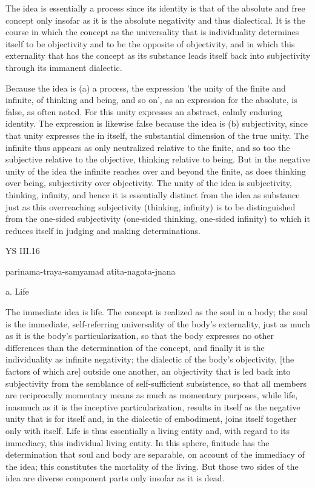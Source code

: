 The idea is essentially a process since its identity is
that of the absolute and free concept only insofar as
it is the absolute negativity and thus dialectical.
It is the course in which the concept
as the universality that is individuality
determines itself to be objectivity
and to be the opposite of objectivity,
and in which this externality
that has the concept as its substance leads
itself back into subjectivity
through its immanent dialectic.

Because the idea is (a) a process, the expression
'the unity of the finite and infinite,
of thinking and being, and so on',
as an expression for the absolute,
is false, as often noted.
For this unity expresses
an abstract, calmly enduring identity.
The expression is likewise false
because the idea is (b) subjectivity,
since that unity expresses the in itself,
the substantial dimension of the true unity.
The infinite thus appears as only
neutralized relative to the finite,
and so too the subjective relative to the objective,
thinking relative to being.
But in the negative unity of the idea
the infinite reaches over and beyond the finite,
as does thinking over being,
subjectivity over objectivity.
The unity of the idea is
subjectivity, thinking, infinity,
and hence it is essentially distinct
from the idea as substance
just as this overreaching subjectivity (thinking, infinity)
is to be distinguished from the one-sided subjectivity
(one-sided thinking, one-sided infinity)
to which it reduces itself in
judging and making determinations.

YS III.16

parinama-traya-samyamad atita-nagata-jnana

a. Life

The immediate idea is life.
The concept is realized as the soul in a body;
the soul is the immediate, self-referring
universality of the body's externality,
just as much as it is the body's particularization,
so that the body expresses no other differences
than the determination of the concept,
and finally it is the individuality as infinite negativity;
the dialectic of the body's objectivity,
[the factors of which are] outside one another,
an objectivity that is led back into subjectivity
from the semblance of self-sufficient subsistence,
so that all members are reciprocally momentary means
as much as momentary purposes,
while life, inasmuch as it is the inceptive particularization,
results in itself as the negative unity that is for itself
and, in the dialectic of embodiment,
joins itself together only with itself.
Life is thus essentially a living entity
and, with regard to its immediacy,
this individual living entity.
In this sphere, finitude has the determination
that soul and body are separable,
on account of the immediacy of the idea;
this constitutes the mortality of the living.
But those two sides of the idea are diverse component parts
only insofar as it is dead.

